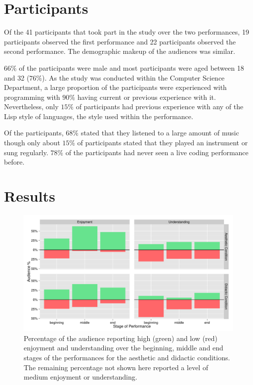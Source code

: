 \section{Participants}

Of the 41 participants that took part in the study over the two performances, 19 participants observed the first performance and 22 participants observed the second performance. The demographic makeup of the audiences was similar.

$66\%$ of the participants were male and most participants were aged between 18 and 32 ($76\%$). As the study was conducted within the Computer Science Department, a large proportion of the participants were experienced with programming with $90\%$ having current or previous experience with it. Nevertheless, only $15\%$ of participants had previous experience with any of the Lisp style of languages, the style used within the performance.

Of the participants, $68\%$ stated that they listened to a large amount of music though only about $15\%$ of participants stated that they played an instrument or sung regularly. $78\%$ of the participants had never seen a live coding performance before.

\section{Results}

\begin{figure}
  \centering
  \includegraphics[width=\columnwidth]{../study-2/results/graphs/dimension-condition.pdf}
  \caption[Survey condition and dimension results]{Percentage of the audience reporting high (green) and low
 (red) enjoyment and understanding over the beginning, middle and end
stages of the performances for the aesthetic and didactic conditions.
The remaining percentage not shown here reported a level of medium
enjoyment or understanding.}
  \label{fig:dimension-condition}
\end{figure}


